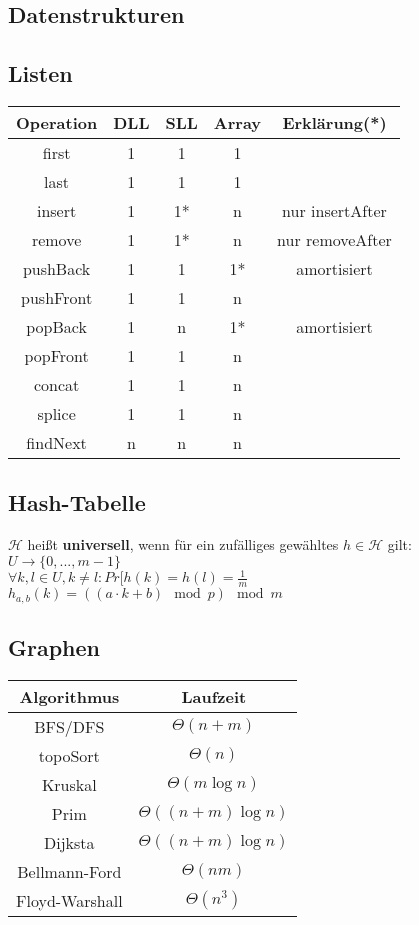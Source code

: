 \documentclass[11pt, a4paper, twoside]{article}
\begin{document}
\begin{multicols}{2}

    \section{Datenstrukturen}

    \subsection{Listen}

    \begin{tabular}{c || c | c | c || c}
        Operation & DLL & SLL & Array & Erklärung(*) \\
        \hline
        first & 1 & 1 & 1 & \\
        last & 1 & 1 & 1 & \\ 
        insert & 1 & 1* & n & nur insertAfter \\
        remove & 1 & 1* & n & nur removeAfter \\
        pushBack & 1 & 1 & 1* & amortisiert \\
        pushFront & 1 & 1 & n & \\
        popBack & 1 & n & 1* & amortisiert \\
        popFront & 1 & 1 & n & \\
        concat & 1 & 1 & n & \\
        splice & 1 & 1 & n \\
        findNext & n & n & n 

    \end{tabular}

    \subsection{Hash-Tabelle}
    $\mathcal{H}$ heißt \textbf{universell}, wenn für ein zufälliges gewähltes
    $h \in \mathcal{H}$ gilt: $U \rightarrow \{0, ..., m-1\}$ \\
    $\forall k, l \in U, k \neq l: Pr[h(k) = h(l) = \frac{1}{m}$ \\
    $h_{a,b}(k) = ((a\cdot k + b) \mod p) \mod m$

    \subsection{Graphen}

    \begin{tabular}{c || c}
        Algorithmus & Laufzeit \\
        \hline
        BFS/DFS & $\Theta(n+m)$\\
        topoSort & $\Theta(n)$\\
        Kruskal & $\Theta(m \log n)$\\
        Prim & $\Theta((n+m)\log n)$ \\
        Dijksta & $\Theta((n + m) \log n)$\\
        Bellmann-Ford & $\Theta(nm)$\\
        Floyd-Warshall & $\Theta(n^3)$ \\
    \end{tabular}


\end{multicols}
\end{document}

